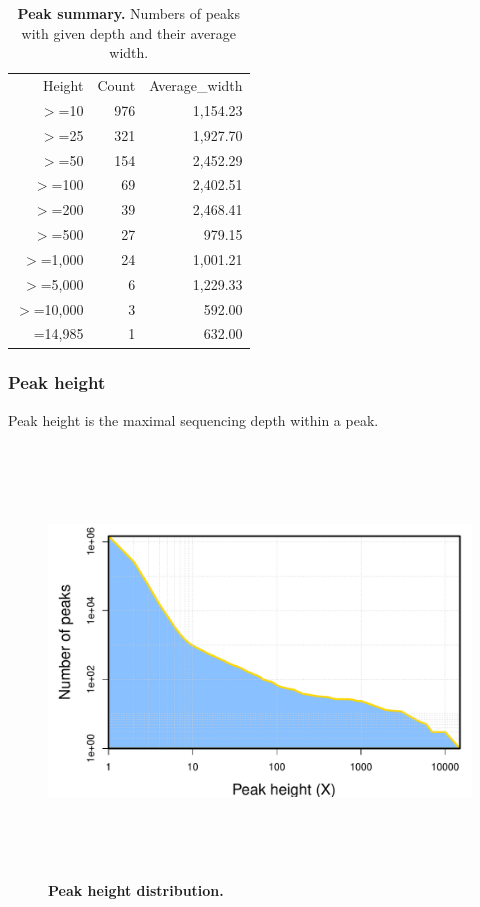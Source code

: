 \documentclass{article}
\begin{document}
\begin{table}
\begin{tabular}{|r|r|r|}
  \hline
Height & Count & Average\_width \\ 
  \rowcolor[gray]{0.9} \hline
$>$=10 & 976 & 1,154.23 \\ 
  $>$=25 & 321 & 1,927.70 \\ 
   \rowcolor[gray]{0.9}$>$=50 & 154 & 2,452.29 \\ 
  $>$=100 &  69 & 2,402.51 \\ 
   \rowcolor[gray]{0.9}$>$=200 &  39 & 2,468.41 \\ 
  $>$=500 &  27 &   979.15 \\ 
   \rowcolor[gray]{0.9}$>$=1,000 &  24 & 1,001.21 \\ 
  $>$=5,000 &   6 & 1,229.33 \\ 
   \rowcolor[gray]{0.9}$>$=10,000 &   3 &   592.00 \\ 
  =14,985 &   1 &   632.00 \\ 
   \hline
\end{tabular}\caption{\textbf{Peak summary.} Numbers of peaks with given depth and their average width.}
\end{table}

\subsubsection{Peak height}
Peak height is the maximal sequencing depth within a peak.
\begin{center}
\begin{figure}[H]
\includegraphics[width=7in, height=4.5in, page=1]{bamchop-chip-peak-height}
\caption{\textbf{Peak height distribution.}}
\end{figure}
\end{center}
\end{document}
